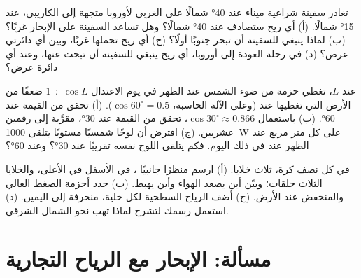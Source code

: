 \begin{exercise}[$\star\star$]\label{exo:g8:winds-global-circulation:10}
تغادر سفينة شراعية ميناء عند \ang{40} شمالًا على  الغربي لأوروبا
متجهة إلى  الكاريبي، عند \ang{15} شمالًا. (أ) أي ريح ستصادف عند
\ang{40} شمالًا؟ وهل تساعد السفينة على الإبحار غربًا؟ (ب) لماذا ينبغي
للسفينة أن تبحر جنوبًا أولًا؟ (ج) أي ريح تحملها غربًا، وبين أي
دائرتي عرض؟ (د) في رحلة العودة إلى أوروبا، أي ريح ينبغي للسفينة أن
تبحث عنها، وعند أي دائرة عرض؟
\end{exercise}

\begin{exercise}[$\star\star\star$]\label{exo:g8:winds-global-circulation:11}
عند  $L$، تغطي حزمة من ضوء الشمس عند الظهر في يوم الاعتدال $1 \div
\cos L$ ضعفًا من الأرض التي تغطيها عند  (وعلى الآلة الحاسبة،
$\cos 60^\circ = 0.5$). (أ) تحقق من القيمة عند \ang{60}. (ب) باستعمال
$\cos 30^\circ \approx 0.866$، تحقق من القيمة عند \ang{30}، مقرَّبة إلى
رقمين عشريين. (ج) افترض أن لوحًا شمسيًا مستويًا يتلقى
\qty{1000}{W} على كل متر مربع عند الظهر عند  في ذلك اليوم.
فكم يتلقى اللوح نفسه تقريبًا عند \ang{30}؟ وعند \ang{60}؟
\end{exercise}

\begin{exercise}[$\star\star\star$]\label{exo:g8:winds-global-circulation:12}
في كل نصف كرة،  ثلاث خلايا. (أ) ارسم منظرًا جانبيًا ،  في الأسفل  في الأعلى، والخلايا الثلاث
حلقات؛ وبيّن أين يصعد الهواء وأين يهبط. (ب) حدد أحزمة الضغط العالي
والمنخفض عند الأرض. (ج) أضف الرياح السطحية لكل خلية، منحرفة إلى اليمين.
(د) استعمل رسمك لتشرح لماذا تهب  نحو
الشمال الشرقي.
\end{exercise}

\section{مسألة: الإبحار مع الرياح التجارية}


